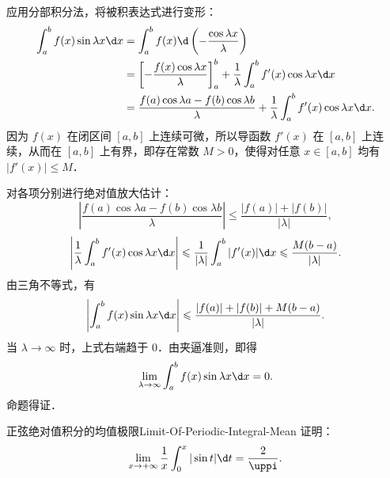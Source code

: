 \begin{myproof}
    应用分部积分法，将被积表达式进行变形：
    \begin{equation}
        \begin{aligned}
            \int_a^b f(x) \sin \lambda x \d x & = \int_a^b f(x) \d\left( -\frac{\cos \lambda x}{\lambda} \right)                                                  \\
                                              & = \left[ -\frac{f(x)\cos \lambda x}{\lambda} \right]_a^b + \frac{1}{\lambda} \int_a^b f'(x) \cos \lambda x \d x   \\
                                              & = \frac{f(a)\cos \lambda a - f(b)\cos \lambda b}{\lambda} + \frac{1}{\lambda} \int_a^b f'(x) \cos \lambda x \d x.
        \end{aligned}
    \end{equation}
    因为 $f(x)$ 在闭区间 $[a, b]$ 上连续可微，所以导函数 $f'(x)$ 在 $[a, b]$ 上连续，从而在 $[a, b]$ 上有界，即存在常数 $M > 0$，使得对任意 $x \in [a, b]$ 均有 $|f'(x)| \leqslant M$．

    对各项分别进行绝对值放大估计：
    \begin{equation}
        \left| \frac{f(a)\cos \lambda a - f(b)\cos \lambda b}{\lambda} \right| \leqslant \frac{|f(a)| + |f(b)|}{|\lambda|},
    \end{equation}
    \begin{equation}
        \left| \frac{1}{\lambda} \int_a^b f'(x) \cos \lambda x \d x \right| \leqslant \frac{1}{|\lambda|} \int_a^b |f'(x)| \d x \leqslant \frac{M(b - a)}{|\lambda|}.
    \end{equation}
    由三角不等式，有
    \begin{equation}
        \left| \int_a^b f(x) \sin \lambda x \d x \right| \leqslant \frac{|f(a)| + |f(b)| + M(b - a)}{|\lambda|}.
    \end{equation}
    当 $\lambda \to \infty$ 时，上式右端趋于 $0$．由夹逼准则，即得
    \begin{equation}
        \lim_{\lambda\to \infty} \int_a^b f(x) \sin \lambda x \d x = 0.
    \end{equation}
    命题得证．
\end{myproof}

\begin{problem}{正弦绝对值积分的均值极限}{Limit-Of-Periodic-Integral-Mean}
    证明：
    \begin{equation}
        \lim_{x\to +\infty} \frac{1}{x} \int_0^x |\sin t| \d t = \frac{2}{\uppi}.
    \end{equation}
\end{problem}

